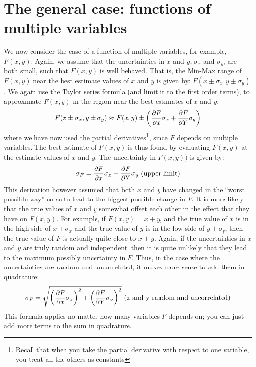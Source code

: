 \section{The general case: functions of multiple variables}

We now consider the case of a function of multiple variables, for example, $F(x,y)$. Again, we assume that the uncertainties in $x$ and $y$, $\sigma_{x}$ and $\sigma_{y}$, are both small, such that $F(x,y)$ is well behaved. That is, the Min-Max range of $F(x,y)$ near the best estimate values of $x$ and $y$ is given by: $F(x\pm\sigma_{x}, y\pm\sigma_{y})$. We again use the Taylor series formula (and limit it to the first order terms), to approximate $F(x,y)$ in the region near the best estimates of $x$ and $y$:
\begin{align}
F(x\pm\sigma_{x}, y\pm\sigma_{y})\approx F(x,y)\pm \left(\frac{\partial F}{\partial x}\sigma_{x} + \frac{\partial F}{\partial Y} \sigma_{y}\right)
\end{align}
where we have now used the partial derivatives\footnote{Recall that when you take the partial derivative with respect to one variable, you treat all the others as constants}, since $F$ depends on multiple variables. The best estimate of $F(x,y)$ is thus found by evaluating $F(x,y)$ at the estimate values of $x$ and $y$. The uncertainty in $F(x,y))$ is given by:
\begin{align}
\label{eqn:maxDerivError}
\sigma_{F} = \frac{\partial F}{\partial x}\sigma_{x} + \frac{\partial F}{\partial Y} \sigma_{y} \text{      (upper limit)}
\end{align}
This derivation however assumed that both $x$ and $y$ have changed in the ``worst possible way'' so as to lead to the biggest possible change in $F$. It is more likely that the true values of $x$ and $y$ somewhat offset each other in the effect that they have on $F(x,y)$. For example, if $F(x,y)=x+y$, and the true value of $x$ is in the high side of $x\pm \sigma_{x}$ and the true value of $y$ is in the low side of $y \pm \sigma_{y}$, then the true value of $F$ is actually quite close to $x+y$. Again, if the uncertainties in $x$ and $y$ are truly random and independent, then it is quite unlikely that they lead to the maximum possibly uncertainty in $F$. Thus, in the case where the uncertainties are random and uncorrelated, it makes more sense to add them in quadrature:
\begin{align}
\label{eqn:derivPropagate}
\sigma_{F} = \sqrt{\left(\frac{\partial F}{\partial x}\sigma_{x}\right)^2 + \left(\frac{\partial F}{\partial Y} \sigma_{y}\right)^2}\text{      (x and y random and uncorrelated)}
\end{align}
This formula applies no matter how many variables $F$ depends on; you can just add more terms to the sum in quadrature. 

